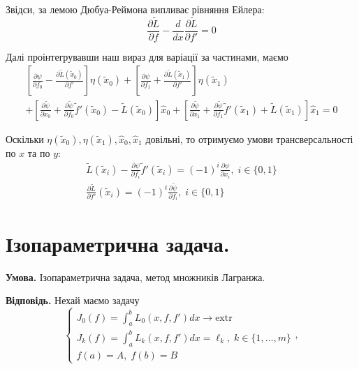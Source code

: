 \documentclass[14pt]{extarticle}
\newcommand{\<}{\langle}
\renewcommand{\>}{\rangle}
\theoremstyle{mystyle}{\newtheorem{definition}{Definition}[section]}
\theoremstyle{mystyle}{\newtheorem{proposition}[definition]{Proposition}}
\theoremstyle{mystyle}{\newtheorem{theorem}[definition]{Theorem}}
\theoremstyle{mystyle}{\newtheorem{lemma}[definition]{Lemma}}
\theoremstyle{mystyle}{\newtheorem{corollary}[definition]{Corollary}}
\theoremstyle{mystyle}{\newtheorem*{remark}{Remark}}
\theoremstyle{mystyle}{\newtheorem*{remarks}{Remarks}}
\theoremstyle{mystyle}{\newtheorem*{example}{Example}}
\theoremstyle{mystyle}{\newtheorem*{examples}{Examples}}
\theoremstyle{definition}{\newtheorem*{exercise}{Exercise}}
\theoremstyle{cstyle}{\newtheorem*{cthm}{}}
\theoremstyle{warn}
\begin{document}
Звідси, за лемою Дюбуа-Реймона випливає рівняння Ейлера:
\begin{equation}
    \frac{\partial\widetilde{L}}{\partial f} - \frac{d}{dx}\frac{\partial \widetilde{L}}{\partial f'} = 0
\end{equation}

Далі проінтегрувавши наш вираз для варіації за частинами, маємо
\begin{gather}
    \left[\frac{\partial\psi}{\partial f_0}-\frac{\partial \widetilde{L}(\widetilde{x}_0)}{\partial f'}\right]\eta(\widetilde{x}_0)+\left[\frac{\partial\psi}{\partial f_1}+\frac{\partial \widetilde{L}(\widetilde{x}_1)}{\partial f'}\right]\eta(\widetilde{x}_1) \\
    +\left[\frac{\partial \widetilde{\psi}}{\partial x_0} + \frac{\partial\widetilde{\psi}}{\partial f_0}\widetilde{f}'(\widetilde{x}_0) - \widetilde{L}(\widetilde{x}_0)\right]\hat{x}_0 + \left[\frac{\partial \widetilde{\psi}}{\partial x_1} + \frac{\partial\widetilde{\psi}}{\partial f_1}\widetilde{f}'(\widetilde{x}_1) + \widetilde{L}(\widetilde{x}_1)\right]\hat{x}_1=0
\end{gather}

Оскільки $\eta(\widetilde{x}_0),\eta(\widetilde{x}_1),\hat{x}_0,\hat{x}_1$ довільні, то отримуємо умови трансверсальності по $x$ та по $y$:
\begin{gather}
    \widetilde{L}(\widetilde{x}_i) - \frac{\partial \psi}{\partial f_i}\widetilde{f}'(\widetilde{x}_i) = (-1)^i\frac{\partial \psi}{\partial x_i}, \; i \in \{0,1\} \\
    \frac{\partial\widetilde{L}}{\partial f'}(\widetilde{x}_i) = (-1)^i\frac{\partial\widetilde{\psi}}{\partial f_i}, \; i \in \{0,1\}
\end{gather}

\pagebreak

\section{Ізопараметрична задача.}

\textbf{Умова.} Ізопараметрична задача, метод множників Лагранжа.

\textbf{Відповідь.} Нехай маємо задачу
\begin{equation}
    \begin{cases}
        J_0(f) = \int_a^b L_0(x,f,f')dx \to \text{extr} \\
        J_k(f) = \int_a^b L_k(x,f,f')dx = \ell_k, \; k \in \{1,\dots,m\} \\
        f(a) = A, \; f(b) = B
    \end{cases},
\end{equation}
\end{document}
